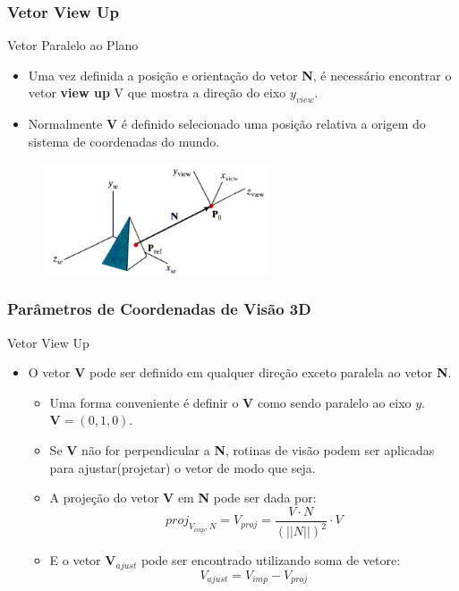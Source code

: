 \documentclass{beamer}
\begin{document}
\begin{frame}
\frametitle{Vetor View Up}
	\begin{block}{Vetor Paralelo ao Plano}
		\begin{itemize}
			\item Uma vez definida a posição e orientação do vetor \textbf{N}, é necessário encontrar o vetor \textbf{view up} V que mostra a direção do eixo $y_{view}$.
			\item Normalmente \textbf{V} é definido selecionado uma posição relativa a origem do sistema de coordenadas do mundo.
		\end{itemize}
	\end{block}
	\begin{figure}[!h]
			\begin{center}
			\includegraphics[width=0.6\textwidth]{Figures/VecN}
			\end{center}
	\end{figure}
\end{frame}

\begin{frame}
\frametitle{Parâmetros de Coordenadas de Visão 3D}
	\begin{block}{Vetor View Up}
		\begin{itemize}
			\item O vetor \textbf{V} pode ser definido em qualquer direção exceto paralela ao vetor \textbf{N}.
			\begin{itemize}
				\item Uma forma conveniente é definir o \textbf{V} como sendo paralelo ao eixo $y$. $\textbf{V}=(0,1,0)$.
				\item Se \textbf{V} não for perpendicular a \textbf{N}, rotinas de visão podem ser aplicadas para ajustar(projetar) o vetor de modo que seja.
				\item A projeção do vetor \textbf{V} em \textbf{N} pode ser dada por:
				\begin{equation*}
					proj_{V_{imp},N} = V_{proj} = \frac{V \cdot N}{(||N||)^2} \cdot V
				\end{equation*}
				\item E o vetor $\textbf{V}_{ajust}$ pode ser encontrado utilizando soma de vetore:
					\begin{equation*}
						V_{ajust} = V_{imp} - V_{proj} 
					\end{equation*}
			\end{itemize}
			
		\end{itemize}
	\end{block}
\end{frame}
\end{document}
